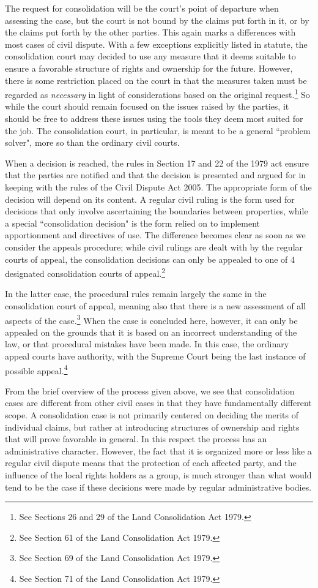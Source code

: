 The request for consolidation will be the court's point of departure when assessing the case, but the court is not bound by the claims put forth in it, or by the claims put forth by the other parties. This again marks a differences with most cases of civil dispute. With a few exceptions explicitly listed in statute, the consolidation court may decided to use any measure that it deems suitable to ensure a favorable structure of rights and ownership for the future. However, there is some restriction placed on the court in that the measures taken must be regarded as \emph{necessary} in light of considerations based on the original request.\footnote{See Sections 26 and 29 of the Land Consolidation Act 1979.} So while the court should remain focused on the issues raised by the parties, it should be free to address these issues using the tools they deem most suited for the job. The consolidation court, in particular, is meant to be a general ``problem solver", more so than the ordinary civil courts.

When a decision is reached, the rules in Section 17 and 22 of the 1979 act ensure that the parties are notified and that the decision is presented and argued for in keeping with the rules of the Civil Dispute Act 2005. The appropriate form of the decision will depend on its content. A regular civil ruling is the form used for decisions that only involve ascertaining the boundaries between properties, while a special ``consolidation decision" is the form relied on to implement apportionment and directives of use. The difference becomes clear as soon as we consider the appeals procedure; while civil rulings are dealt with by the regular courts of appeal, the consolidation decisions can only be appealed to one of 4 designated consolidation courts of appeal.\footnote{See Section 61 of the Land Consolidation Act 1979.} 

In the latter case, the procedural rules remain largely the same in the consolidation court of appeal, meaning also that there is a new assessment of all aspects of the case.\footnote{See Section 69 of the Land Consolidation Act 1979.} When the case is concluded here, however, it can only be appealed on the grounds that it is based on an incorrect understanding of the law, or that procedural mistakes have been made. In this case, the ordinary appeal courts have authority, with the Supreme Court being the last instance of possible appeal.\footnote{See Section 71 of the Land Consolidation Act 1979.}

From the brief overview of the process given above, we see that consolidation cases are different from other civil cases in that they have fundamentally different scope. A consolidation case is not primarily centered on deciding the merits of individual claims, but rather at introducing structures of ownership and rights that will prove favorable in general. In this respect the process has an administrative character. However, the fact that it is organized more or less like a regular civil dispute means that the protection of each affected party, and the influence of the local rights holders as a group, is much stronger than what would tend to be the case if these decisions were made by regular administrative bodies.


